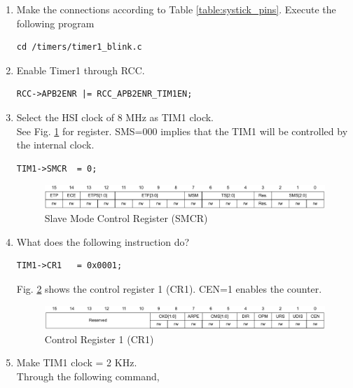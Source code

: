 \documentclass[journal,12pt,twocolumn]{IEEEtran}
\renewcommand\thesection{\arabic{section}}
\renewcommand\thesubsection{\thesection.\arabic{subsection}}
\begin{document}
\begin{enumerate}[label=\thesubsection.\arabic*.,ref=\thesubsection.\theenumi]
\subsection{TIMER-1}
\item Make the connections according to Table \ref{table:systick_pins}.  Execute the following program
\begin{lstlisting}
cd /timers/timer1_blink.c
\end{lstlisting}
\label{prob:APB2_TIM1}
\item Enable Timer1 through RCC.
\\
\solution 
\begin{lstlisting}
RCC->APB2ENR |= RCC_APB2ENR_TIM1EN;  
\end{lstlisting}
\item Select the HSI clock of 8 MHz as TIM1 clock.
\\
\solution See Fig.  \ref{fig:smcr} for register. SMS=000 implies that the TIM1 will be controlled by the internal clock.
\begin{lstlisting}
TIM1->SMCR  = 0;
\end{lstlisting}
\begin{figure}[!ht]
\includegraphics[width=\columnwidth]{./stm32/timers/figs/smcr.eps}
\caption{Slave Mode Control Register (SMCR)}
\label{fig:smcr}
\end{figure}
\item What does the following instruction do?
\begin{lstlisting}
TIM1->CR1 	= 0x0001;
\end{lstlisting}
\solution Fig. \ref{fig:cr1} shows the control register 1 (CR1). CEN=1 enables the counter.
\begin{figure}[!ht]
\begin{center}
\includegraphics[width=\columnwidth]{./stm32/timers/figs/cr1.eps}
\end{center}
\caption{Control Register 1 (CR1)}
\label{fig:cr1}
\end{figure}
\item Make TIM1 clock = 2 KHz.
\\
\solution Through the following command,
\begin{lstlisting}

\end{lstlisting}
\end{enumerate}
\end{document}
